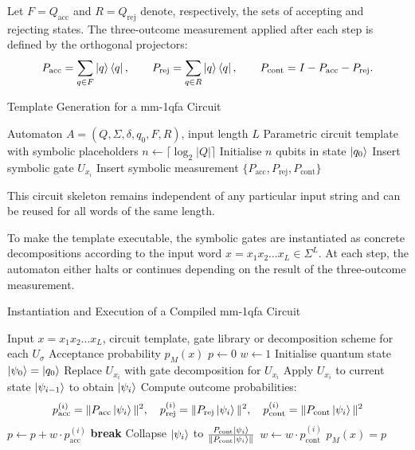 Let $F = Q_{\text{acc}}$ and $R = Q_{\text{rej}}$ denote, respectively, the sets of accepting and rejecting states. The three-outcome measurement applied after each step is defined by the orthogonal projectors:
\[
P_{\text{acc}} = \sum_{q \in F} \ket{q}\bra{q}, \qquad
P_{\text{rej}} = \sum_{q \in R} \ket{q}\bra{q}, \qquad
P_{\text{cont}} = I - P_{\text{acc}} - P_{\text{rej}}.
\]

\begin{algorithm}[H]
\caption{Template Generation for a \gls{mm-1qfa} Circuit}
\label{alg:mmqfa-template}
\begin{algorithmic}[1]
\Require Automaton $A = (Q, \Sigma, \delta, q_0, F, R)$,\; input length $L$
\Ensure Parametric circuit template with symbolic placeholders
\State $n \gets \lceil \log_2 |Q| \rceil$
\State Initialise $n$ qubits in state $\ket{q_0}$
   \State Insert symbolic gate $\boxed{U_{x_i}}$
   \State Insert symbolic measurement $\{P_{\text{acc}}, P_{\text{rej}}, P_{\text{cont}}\}$
\EndFor
\end{algorithmic}
\end{algorithm}

This circuit skeleton remains independent of any particular input string and can be reused for all words of the same length.

\medskip

To make the template executable, the symbolic gates are instantiated as concrete decompositions according to the input word $x = x_1x_2\dots x_L \in \Sigma^L$. At each step, the automaton either halts or continues depending on the result of the three-outcome measurement.
\begin{algorithm}[H]
  \caption{Instantiation and Execution of a Compiled \gls{mm-1qfa} Circuit}
  \label{alg:mmqfa-instantiation}
  \begin{algorithmic}[1]
  \Require Input $x = x_1x_2\dots x_L$, circuit template, gate library or decomposition scheme for each $U_\sigma$
  \Ensure Acceptance probability $p_M(x)$
  \State $p \gets 0$ 
  \State $w \gets 1$ 
  \State Initialise quantum state $\ket{\psi_0} = \ket{q_0}$
     \State Replace $\boxed{U_{x_i}}$ with gate decomposition for $U_{x_i}$
     \State Apply $U_{x_i}$ to current state $\ket{\psi_{i-1}}$ to obtain $\ket{\psi_i}$
     \State Compute outcome probabilities:
     \[
        p_{\text{acc}}^{(i)} = \|P_{\text{acc}} \ket{\psi_i}\|^2, \quad
        p_{\text{rej}}^{(i)} = \|P_{\text{rej}} \ket{\psi_i}\|^2, \quad
        p_{\text{cont}}^{(i)} = \|P_{\text{cont}} \ket{\psi_i}\|^2
     \]
     \State $p \gets p + w \cdot p_{\text{acc}}^{(i)}$
        \State \textbf{break} 
     \Else
        \State Collapse $\ket{\psi_i}$ to $\frac{P_{\text{cont}} \ket{\psi_i}}{\|P_{\text{cont}} \ket{\psi_i}\|}$
        \State $w \gets w \cdot p_{\text{cont}}^{(i)}$
     \EndIf
  \EndFor
  \State \Return $p_M(x) = p$
  \end{algorithmic}
\end{algorithm}

